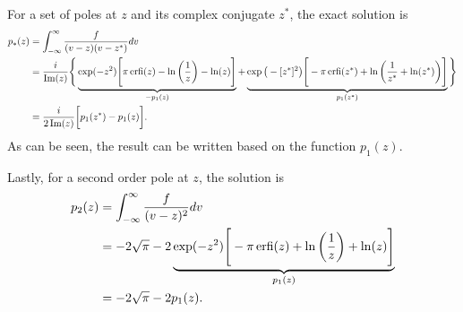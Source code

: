 For a set of poles at $z$ and its complex conjugate $z^*$, the exact solution is
\begin{align}
	p_*(z) &=  \int_{-\infty}^\infty \frac{f}{(v-z)(v-z^*)} dv  \nonumber \\
	&= \frac{i}{\operatorname{Im}(z)} \Bigg\{ \underbrace{\exp(-z^2) \Bigg[ \pi \operatorname{erfi}(z) - \ln\bigg(\frac{1}{z}\bigg) - \ln(z)  \Bigg]}_{-p_1(z)}
	+ \underbrace{\exp\big(-[z^*]^2\big) \Bigg[ -\pi \operatorname{erfi}(z^*) + \ln \bigg(\frac{1}{z^*} + \ln(z^*) \bigg) \Bigg]}_{p_1(z^*)}
	\Bigg\}	\nonumber \\
	&= \frac{i}{2\operatorname{Im}(z)} \bigg[ p_1(z^*) - p_1(z) \bigg].
\end{align}
As can be seen, the result can be written based on the function $p_1(z)$.

Lastly, for a second order pole at $z$, the solution is
\begin{align}
	p_2(z) &= \int_{-\infty}^\infty \frac{f}{(v-z)^2} dv  \nonumber \\
	&= -2 \sqrt{\pi} - 2\underbrace{ \exp(-z^2) \Bigg[ -\pi \operatorname{erfi}(z) + \ln\bigg(\frac{1}{z}\bigg) + \ln(z)  \Bigg]}_{p_1(z)} \nonumber \\
	&= -2 \sqrt{\pi} - 2 p_1(z).
\end{align}
